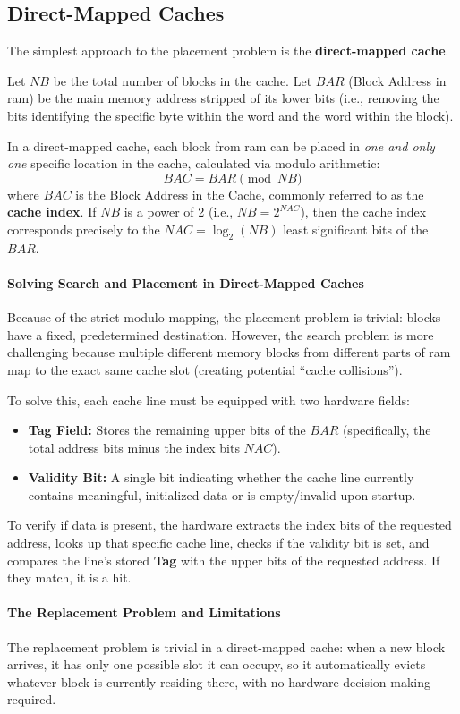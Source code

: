 \subsection{Direct-Mapped Caches}
The simplest approach to the placement problem is the \textbf{direct-mapped cache}. 

Let $NB$ be the total number of blocks in the cache. Let $BAR$ (Block Address in \gls{ram}) be the main memory address stripped of its lower bits (i.e., removing the bits identifying the specific byte within the word and the word within the block). 

In a direct-mapped cache, each block from \gls{ram} can be placed in \textit{one and only one} specific location in the cache, calculated via modulo arithmetic:
\[ BAC = BAR \pmod{NB} \]
where $BAC$ is the Block Address in the Cache, commonly referred to as the \textbf{cache index}. If $NB$ is a power of 2 (i.e., $NB = 2^{NAC}$), then the cache index corresponds precisely to the $NAC = \log_2(NB)$ least significant bits of the $BAR$.

\paragraph{Solving Search and Placement in Direct-Mapped Caches}
Because of the strict modulo mapping, the placement problem is trivial: blocks have a fixed, predetermined destination. However, the search problem is more challenging because multiple different memory blocks from different parts of \gls{ram} map to the exact same cache slot (creating potential ``cache collisions'').

To solve this, each cache line must be equipped with two hardware fields:
\begin{itemize}
    \item \textbf{Tag Field:} Stores the remaining upper bits of the $BAR$ (specifically, the total address bits minus the index bits $NAC$). 
    \item \textbf{Validity Bit:} A single bit indicating whether the cache line currently contains meaningful, initialized data or is empty/invalid upon startup.
\end{itemize}
To verify if data is present, the hardware extracts the index bits of the requested address, looks up that specific cache line, checks if the validity bit is set, and compares the line's stored \textbf{Tag} with the upper bits of the requested address. If they match, it is a hit.

\paragraph{The Replacement Problem and Limitations}
The replacement problem is trivial in a direct-mapped cache: when a new block arrives, it has only one possible slot it can occupy, so it automatically evicts whatever block is currently residing there, with no hardware decision-making required. 

